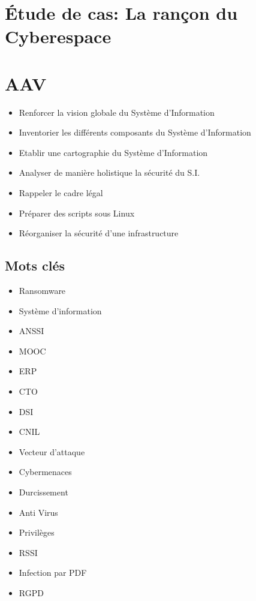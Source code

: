 \section*{Étude de cas: La rançon du Cyberespace}

\section*{AAV}
\begin{itemize}
  \item [5] Renforcer la vision globale du Système d'Information
  \item [3] Inventorier les différents composants du Système d'Information
  \item [4] Etablir une cartographie du Système d'Information
  \item [4] Analyser de manière holistique la sécurité du S.I.
  \item [1] Rappeler le cadre légal
  \item [3] Préparer des scripts sous Linux
  \item [5] Réorganiser la sécurité d'une infrastructure
\end{itemize}

\subsection*{Mots clés}
{}
\begin{itemize}
  \item Ransomware
  \item Système d'information
  \item ANSSI
  \item MOOC
  \item ERP
  \item CTO
  \item DSI
  \item CNIL
  \item Vecteur d'attaque
  \item Cybermenaces
  \item Durcissement
  \item Anti Virus
  \item Privilèges
  \item RSSI
  \item Infection par PDF
  \item RGPD
\end{itemize}

